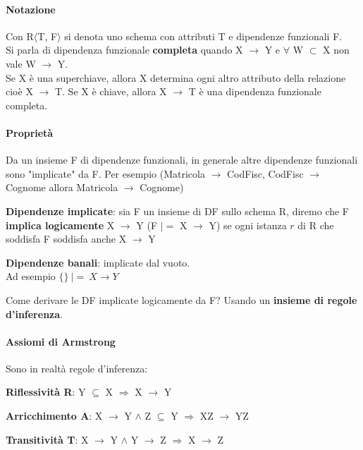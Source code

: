 \documentclass[10pt]{book}
\begin{document}
\paragraph{Notazione} Con R$\langle$T, F$\rangle$ si denota uno schema con attributi T e dipendenze funzionali F.\\
Si parla di dipendenza funzionale \textbf{completa} quando X $\rightarrow$ Y e $\forall$ W $\subset$ X non vale W $\rightarrow$ Y.\\
Se X è una superchiave, allora X determina ogni altro attributo della relazione cioè X $\rightarrow$ T. Se X è chiave, allora X $\rightarrow$ T è una dipendenza funzionale completa.
\paragraph{Proprietà} Da un insieme F di dipendenze funzionali, in generale altre dipendenze funzionali sono "implicate" da F. Per esempio (Matricola $\rightarrow$ CodFisc, CodFisc $\rightarrow$ Cognome allora Matricola $\rightarrow$ Cognome)
\begin{list}{}{}
	\item \textbf{Dipendenze implicate}: sia F un insieme di DF sullo schema R, diremo che F \textbf{implica logicamente} X $\rightarrow$ Y (F $|=$ X $\rightarrow$ Y) se ogni istanza $r$ di R che soddisfa F soddisfa anche X $\rightarrow$ Y
	\item \textbf{Dipendenze banali}: implicate dal vuoto.\\
	Ad esempio $\{\}\:|=\:X \rightarrow Y$
\end{list}
Come derivare le DF implicate logicamente da F? Usando un \textbf{insieme di regole d'inferenza}.
\paragraph{Assiomi di Armstrong} Sono in realtà regole d'inferenza:
\begin{list}{}{}
	\item \textbf{Riflessività R}: Y $\subseteq$ X $\Rightarrow$ X $\rightarrow$ Y
	\item \textbf{Arricchimento A}: X $\rightarrow$ Y $\wedge$ Z $\subseteq$ Y $\Rightarrow$ XZ $\rightarrow$ YZ
	\item \textbf{Transitività T}: X $\rightarrow$ Y $\wedge$ Y $\rightarrow$ Z $\Rightarrow$ X $\rightarrow$ Z 
\end{list}
\end{document}
